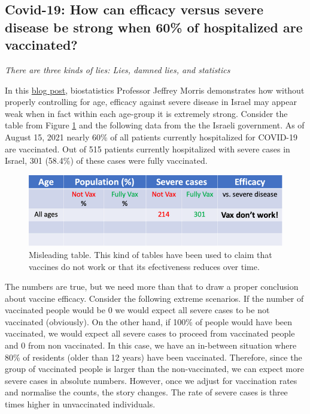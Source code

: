 \documentclass[
]{book}
\newenvironment{rnote}{\par\raggedleft}{\par}
\begin{document}
\hypertarget{covid-israel}{%
\subsection{Covid-19: How can efficacy versus severe disease be strong when 60\% of hospitalized are vaccinated?}\label{covid-israel}}

\begin{rnote}
\emph{There are three kinds of lies: Lies, damned lies, and statistics}

\end{rnote}

In this \href{https://www.covid-datascience.com/post/israeli-data-how-can-efficacy-vs-severe-disease-be-strong-when-60-of-hospitalized-are-vaccinated}{blog post}, biostatistics Professor Jeffrey Morris demonstrates how without properly controlling for age, efficacy against severe disease in Israel may appear weak when in fact within each age-group it is extremely strong. Consider the table from Figure \ref{fig:vaccine-rates-a} and the following data from the the Israeli government. As of August 15, 2021 nearly 60\% of all patients currently hospitalized for COVID-19 are vaccinated. Out of 515 patients currently hospitalized with severe cases in Israel, 301 (58.4\%) of these cases were fully vaccinated.

\begin{figure}

{\centering \includegraphics[width=0.7\linewidth]{Figures/vaccines-ex-fig1} 

}

\caption{Misleading table. This kind of tables have been used to claim that vaccines do not work or that its efectiveness reduces over time.}\label{fig:vaccine-rates-a}
\end{figure}

The numbers are true, but we need more than that to draw a proper conclusion about vaccine efficacy. Consider the following extreme scenarios. If the number of vaccinated people would be 0 we would expect all severe cases to be not vaccinated (obviously). On the other hand, if 100\% of people would have been vaccinated, we would expect all severe cases to proceed from vaccinated people and 0 from non vaccinated. In this case, we have an in-between situation where 80\% of residents (older than 12 years) have been vaccinated. Therefore, since the group of vaccinated people is larger than the non-vaccinated, we can expect more severe cases in absolute numbers. However, once we adjust for vaccination rates and normalise the counts, the story changes. The rate of severe cases is three times higher in unvaccinated individuals.
\end{document}
